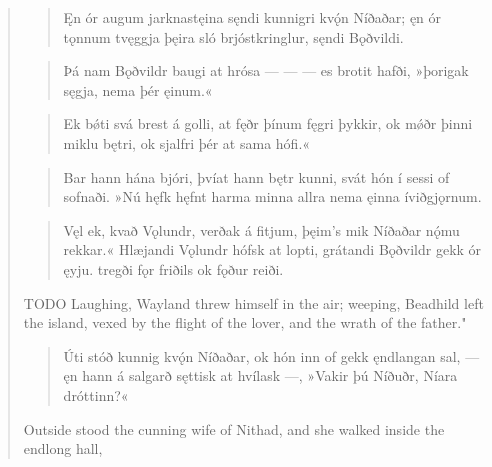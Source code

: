 \begin{verse}

\begin{verse}
\bva Ęn ór augum \hld jarknastęina
sęndi kunnigri \hld kvǫ́n Níðaðar;
ęn ór tǫnnum \hld tvęggja þęira
sló brjóstkringlur, \hld sęndi Bǫðvildi. \\%
\end{verse}


\begin{verse}
\bva Þá nam Bǫðvildr \hld baugi at hrósa
— — — \hld es brotit hafði,
»þorigak sęgja, \hld nema þér ęinum.«  \\%
\end{verse}


\begin{verse}
\bva Ek bǿti svá \hld brest á golli,
at fęðr þínum \hld fęgri þykkir,
ok mǿðr þinni \hld miklu bętri,
ok sjalfri þér \hld at sama hófi.«  \\%
\end{verse}


\begin{verse}
\bva Bar hann hána bjóri, \hld þvíat hann bętr kunni,
svát hón í sessi \hld of sofnaði.
»Nú hęfk hęfnt \hld harma minna
allra nema ęinna \hld íviðgjǫrnum. \\%
\end{verse}


\begin{verse}
\bva Vęl ek, kvað Vǫlundr, \hld verðak á fitjum,
þęim's mik Níðaðar \hld nǫ́mu rekkar.« 
Hlæjandi Vǫlundr \hld hófsk at lopti,
grátandi Bǫðvildr \hld gekk ór ęyju.
tregði fǫr friðils \hld ok fǫður reiði. \\%
\end{verse}

\bvb TODO Laughing, Wayland threw himself in the air; weeping, Beadhild left the island, vexed by the flight of the lover, and the wrath of the father."

\begin{verse}
\bva Úti stóð kunnig \hld kvǫ́n Níðaðar,
ok hón inn of gekk \hld ęndlangan sal,
— ęn hann á salgarð \hld sęttisk at hvílask —,
»Vakir þú Níðuðr, \hld Níara dróttinn?«  \\%
\end{verse}

\bvb Outside stood the cunning wife of Nithad, and she walked inside the endlong hall,


\end{verse}
